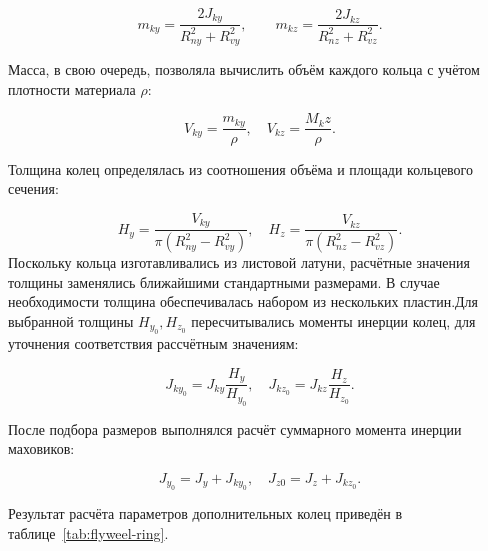 \begin{equation}
	\label{eq:flyweel_mass}
	m_{ky}=\frac{2J_{ky}}{R_{ny}^2+R_{vy}^2}, \quad \quad m_{kz}=\frac{2J_{kz}}{R_{nz}^2+R_{vz}^2}.
\end{equation}

Масса, в свою очередь, позволяла вычислить объём каждого кольца с учётом плотности материала $\rho$:

\begin{equation}
	\label{eq:flyweel_volume}
	V_{ky} = \frac{m_{ky}}{\rho}, \quad V_{kz}=\frac{M_kz}{\rho}.
	\end{equation}
	
	
Толщина колец определялась из соотношения объёма и площади кольцевого сечения:

\begin{equation}
	\label{eq:flywell_thickness}
	H_y=\frac{V_{ky}}{\pi(R_{ny}^2-R_{vy}^2)}, \quad H_z=\frac{V_{kz}}{\pi(R_{nz}^2-R_{vz}^2)}.
	\end{equation}
Поскольку кольца изготавливались из листовой латуни, расчётные значения толщины заменялись ближайшими стандартными размерами. В случае необходимости толщина обеспечивалась набором из нескольких пластин.Для выбранной толщины $H_{y_{0}}, H_{z_{0}}$ пересчитывались моменты инерции колец, для уточнения соответствия рассчётным значениям:

\begin{equation}
	\label{eq:final_ring_inertia}
	J_{ky_0}=J_{ky}\frac{H_y}{H_{y_{0}}}, \quad J_{kz_{0}}=J_{kz}\frac{H_z}{H_{z_{0}}}.
	\end{equation}
	
После подбора размеров выполнялся расчёт суммарного момента инерции маховиков:

\begin{equation}
	\label{eq:flyweel_sum_inertia}
	J_{y_0}=J_y+J_{ky_{0}}, \quad J_{z0}=J_{z}+J_{kz_{0}}.
\end{equation}

Результат расчёта параметров дополнительных колец приведён в таблице~\cref{tab:flyweel-ring}.


